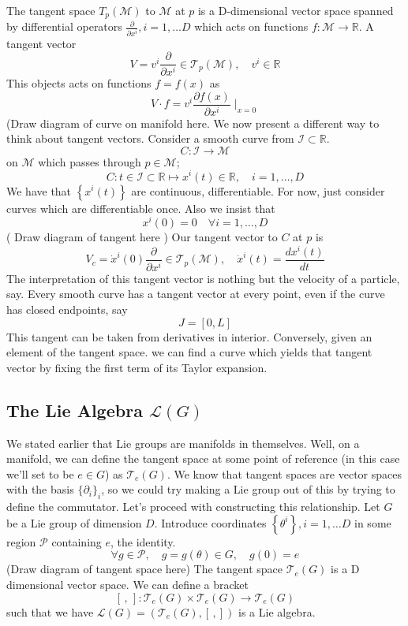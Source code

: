 \documentclass[11pt, oneside]{article}   	%
\theoremstyle{slanted}
\begin{document}
The tangent space $T_{ p } ( \mathcal{ M } ) $ to $ \mathcal{ M } $ at $ p $ is a D-dimensional vector space spanned by differential operators 
$ \frac{\partial  }{\partial x^{i }} , i = 1, \dots D $
which acts on functions $ f : \mathcal{ M  } \to  \mathbb{R} $. A tangent vector 
\[
	V = v^{i } \frac{\partial }{\partial x^{i  } } \in \mathcal{ T }_p ( \mathcal{ M }), \quad v^{ i } \in \mathbb{ R} 
\] This objects acts on functions $ f = f ( x) $ as 
\[
	V \cdot  f  = v^{ i } \frac{\partial  f ( x)  }{\partial x^{ i }} \mid_{ x = 0 } 
\] (Draw diagram of curve on manifold here. 
We now present a different way to think about tangent vectors. 
Consider  a smooth curve from $ \mathcal{ I } \subset \mathbb{ R} $. 
\[
 C : \mathcal{ I } \to  \mathcal{ M }
\] on $ \mathcal{ M } $ which passes through $ p \in \mathcal{ M }$; 
\[
	C : t \in \mathcal{ I } \subset \mathbb{ R} \mapsto x^{ i } ( t ) \in \mathbb{ R}, \quad i = 1, \dots, D 
\] We have that $ \left\{  x^{ i } ( t)  \right\} $ are continuous, differentiable. 
For now, just consider curves which are 
differentiable once. Also we insist that 
\[
	x^{ i } ( 0 )  = 0 \quad \forall i = 1, \dots, D 
\] ( Draw diagram of tangent here ) 
Our tangent vector to $ C $ at $ p $ is 
\[
	V_{ c }  = \dot { x}^{ i } ( 0 ) \frac{\partial }{\partial x^{ i }} \in \mathcal{ T }_p ( \mathcal{ M }), \quad \dot{ x}^{ i } (t ) = \frac{d x^{ i }( t) }{ dt }	\] The interpretation 
	of this tangent vector is nothing but the velocity of a 
	particle, say. 
Every smooth curve has a tangent vector at every point, even if 
the curve has closed endpoints, say 
\[
 J = [ 0 , L ] 
\] This tangent can be taken from derivatives in interior. 
Conversely, given an element of the tangent space. 
we can find a curve which yields that tangent vector 
by fixing the first term of its Taylor expansion. 

\pagebreak
\subsection{The Lie Algebra $ \mathcal{ L } ( G ) $ } 

We stated earlier that Lie groups are manifolds in themselves. Well, on a manifold, we can define the tangent space at some point of reference (in this case we'll set to be $e \in G$) as $\mathcal{T}_{e}(G)$. We know that tangent spaces are vector spaces with the basis $\{ \partial_i\}_i $, so we could try making a Lie group out of this by trying to define the commutator. Let's 
proceed with constructing this relationship. 
Let $ G $ be a Lie group of dimension $ D $. Introduce 
coordinates $ \left\{  \theta ^{ i } \right\} , i  = 1, \dots D $ 
in some region $ \mathcal{ P } $ containing $ e $, the identity. 
\[
	\forall g \in \mathcal{ P }, \quad  g = g (\theta ) \in G, \quad g ( 0 ) =e  
\]  (Draw diagram of tangent space here) 
The tangent space $ \mathcal{ T }_{ e } ( G )  $ is a
D dimensional vector space. We can define a bracket 
\[
	[  \, , \, ] : \mathcal{ T }_e ( G) \times \mathcal{ T }_e ( G ) \to  \mathcal{ T }_ e ( G ) 
\] such that we have $ \mathcal{ L } ( G ) = ( \mathcal{ T}_e (  G ), [ \, , ] ) $
is a Lie algebra. 
\end{document}
